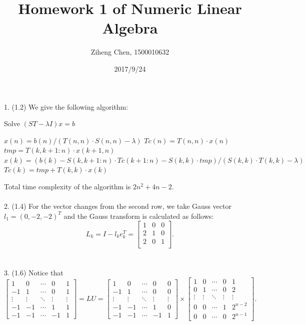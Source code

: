 \documentclass[11pt]{article}
\begin{document}
\title{Homework 1 of Numeric Linear Algebra}
\date{2017/9/24}
\author{Ziheng Chen, 1500010632}
\maketitle

1. (1.2) We give the following algorithm:
\begin{algorithm}[H]
\caption{Solve $(ST-\lambda I)x=b$}
\begin{algorithmic}[1]
\State $ x(n) = b(n) / (T(n, n) \cdot S(n, n) - \lambda) $
\State $ Tc(n) = T(n, n) \cdot x(n) $
	\State $ tmp = T(k,k+1:n) \cdot x(k+1,n) $
	\State $ x(k) = (b(k)-S(k,k+1:n)\cdot Tc(k+1:n)-S(k,k)\cdot tmp) / (S(k,k)\cdot T(k,k)-\lambda) $
	\State $ Tc(k) = tmp + T(k,k) \cdot x(k) $
\EndFor
\end{algorithmic}
\end{algorithm}
Total time complexity of the algorithm is $2 n^2 + 4n - 2$.
\\\\
2. (1.4) For the vector changes from the second row, we take Gauss vector $l_1 = (0, -2, -2)^T$ and the Gauss transform is calculated as follows:
$$ L_k = I - l_k e_k^T = \begin{bmatrix} 1 & 0 & 0 \\ 2 & 1 & 0 \\ 2 & 0 & 1 \\ \end{bmatrix}. $$
\\\\
3. (1.6) Notice that 
$$ \begin{bmatrix}1 & 0 & \cdots & 0 & 1 \\ -1 & 1 & \cdots & 0 & 1 \\ \vdots & \vdots & \ddots & \vdots & \vdots \\ -1 & -1 & \cdots & 1 & 1 \\ -1 & -1 & \cdots & -1 & 1\end{bmatrix}
= L U
= \begin{bmatrix}1 & 0 & \cdots & 0 & 0 \\ -1 & 1 & \cdots & 0 & 0 \\ \vdots & \vdots & \ddots & \vdots & \vdots \\ -1 & -1 & \cdots & 1 & 0 \\ -1 & -1 & \cdots & -1 & 1\end{bmatrix}
\times \begin{bmatrix}1 & 0 & \cdots & 0 & 1 \\ 0 & 1 & \cdots & 0 & 2 \\ \vdots & \vdots & \ddots & \vdots & \vdots \\ 0 & 0 & \cdots & 1 & 2^{n-2} \\ 0 & 0 & \cdots & 0 & 2^{n-1}\end{bmatrix}.$$
\end{document}
